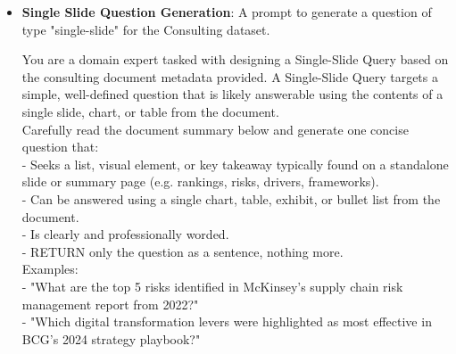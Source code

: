 \documentclass[12pt,twoside]{report}
\begin{document}
\begin{itemize}
\begin{colquote}
    Carefully read the document summary below and generate one clear, precise question that: \\
    - Seeks a directly stated fact, statistic, figure, name, or metric (e.g. “What was the EBITDA margin in 2022?”). \\
    - Can be answered with a single sentence or data point from the document. \\
    - Is professionally phrased and unambiguous. \\
    - RETURN only the question as a sentence, nothing more. \\

    Examples: \\
    - "What was the projected revenue CAGR for the automotive sector in Bain's 2023 market outlook report?" \\
    - "Which company led global smartphone shipments in Q4 2023 according to the analysis?" \\

    The document information: \\
    topic: \{topic\} \\
    summary: \{summary\}
    \end{colquote}

    \item \textbf{Single Slide Question Generation}: A prompt to generate a question of type "single-slide" for the Consulting dataset.
    \begin{colquote}
    You are a domain expert tasked with designing a Single-Slide Query based on the consulting document metadata provided. A Single-Slide Query targets a simple, well-defined question that is likely answerable using the contents of a single slide, chart, or table from the document. \\

    Carefully read the document summary below and generate one concise question that: \\
    - Seeks a list, visual element, or key takeaway typically found on a standalone slide or summary page (e.g. rankings, risks, drivers, frameworks). \\
    - Can be answered using a single chart, table, exhibit, or bullet list from the document. \\
    - Is clearly and professionally worded. \\
    - RETURN only the question as a sentence, nothing more. \\

    Examples: \\
    - "What are the top 5 risks identified in McKinsey's supply chain risk management report from 2022?" \\
    - "Which digital transformation levers were highlighted as most effective in BCG's 2024 strategy playbook?" \\


\end{colquote}
\end{itemize}
\end{document}
